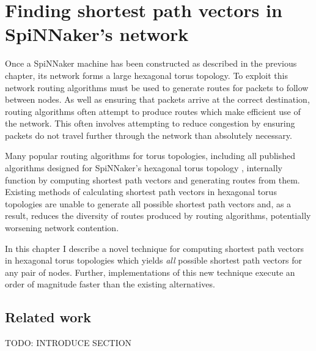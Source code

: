 \chapter{Finding shortest path vectors in SpiNNaker's network}
	
	Once a SpiNNaker machine has been constructed as described in the previous
	chapter, its network forms a large hexagonal torus topology. To exploit this
	network routing algorithms must be used to generate routes for packets to
	follow between nodes. As well as ensuring that packets arrive at the correct
	destination, routing algorithms often attempt to produce routes which make
	efficient use of the network. This often involves attempting to reduce
	congestion by ensuring packets do not travel further through the network than
	absolutely necessary.
	
	Many popular routing algorithms for torus topologies, including all published
	algorithms designed for SpiNNaker's hexagonal torus topology
	\cite{davies12,navaridas14}, internally function by computing shortest path
	vectors and generating routes from them. Existing methods of calculating
	shortest path vectors in hexagonal torus topologies are unable to generate
	all possible shortest path vectors and, as a result, reduces the diversity of
	routes produced by routing algorithms, potentially worsening network
	contention.
	
	In this chapter I describe a novel technique for computing shortest path
	vectors in hexagonal torus topologies which yields \emph{all} possible
	shortest path vectors for any pair of nodes. Further, implementations of this
	new technique execute an order of magnitude faster than the existing
	alternatives.
	
	\section{Related work}
		
		TODO: INTRODUCE SECTION
		

